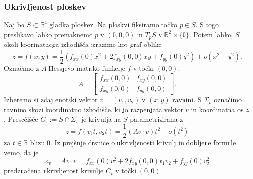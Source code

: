 \documentclass[8pt]{beamer}
\theoremstyle{definition}
\theoremstyle{remark}
\theoremstyle{plain}
\numberwithin{equation}{section}  %
\begin{document}
\begin{frame}
    \frametitle{Ukrivljenost ploskev}

    Naj bo $S \subset \mathbb{R}^3$ gladka ploskev. Na ploskvi fiksiramo točko $p \in S$. S togo preslikavo lahko premaknemo $p$ v $(0,0,0)$ in $T_p S$ v $\mathbb{R}^2 \times\{0\}$. Potem lahko, $S$ okoli koorinatnega izhodišča izrazimo kot graf oblike 
    \begin{equation*}
        z=f(x, y)=\frac{1}{2}\left(f_{x x}(0) x^2+2 f_{x y}(0,0) x y+f_{y y}(0) y^2\right)+o\left(x^2+y^2\right). 
    \end{equation*}
    Označimo z $A$ Hessjevo matriko funkcije $f$ v točki $(0,0)$:
    \begin{equation*}
        A=\begin{bmatrix}
            f_{x x}(0,0) & f_{x y}(0,0) \\
            f_{x y}(0,0) & f_{y y}(0,0)
        \end{bmatrix} .
    \end{equation*}
    Izberemo si zdaj enotski vektor $v=\left(v_1, v_2\right)$ v $(x,y)$ ravnini. S $\Sigma_v$ označimo ravnino skozi koordinatno izhodišče, ki jo razpenjata vektor $v$ in koordinatna os $z$. Presečišče $C_v:=S \cap \Sigma_v$ je krivulja na $S$ parametrizirana z
    \begin{equation*}
        z=f\left(v_1 t, v_2 t\right)=\frac{1}{2}(A v \cdot v) t^2+o\left(t^2\right)
    \end{equation*}
    za $t \in \mathbb{R}$ blizu $0$. Iz prejšnje drsnice o ukrivljenosti krivulj in dobljene formule vemo, da je 
    \begin{equation*}
        \kappa_v=A v \cdot v=f_{x x}(0) v_1^2+2 f_{x y}(0,0) v_1 v_2+f_{y y}(0) v_2^2
    \end{equation*}
    predznačena ukrivljenost krivulje $C_v$ v točki $(0,0)$. 

\end{frame}
\end{document}
